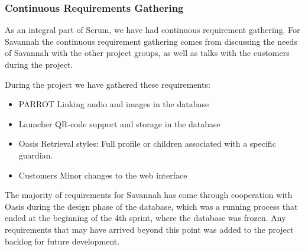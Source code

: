 
\subsubsection*{Continuous Requirements Gathering}
As an integral part of Scrum, we have had continuous requirement gathering.
For Savannah the continuous requirement gathering comes from discussing the needs of Savannah with the other project groups, as well as talks with the customers
during the project.

During the project we have gathered these requirements:
\begin{itemize}
 \item PARROT
  \subitem Linking audio and images in the database
 \item Launcher
  \subitem QR-code support and storage in the database
 \item Oasis
  \subitem Retrieval styles: Full profile or children associated with a specific guardian.
 \item Customers
  \subitem Minor changes to the web interface
\end{itemize}

The majority of requirements for Savannah has come through cooperation with Oasis during the design phase of the database, which was a running process that ended
at the beginning of the 4th sprint, where the database was frozen. Any requirements that may have arrived beyond this point was added to the project backlog for future development.